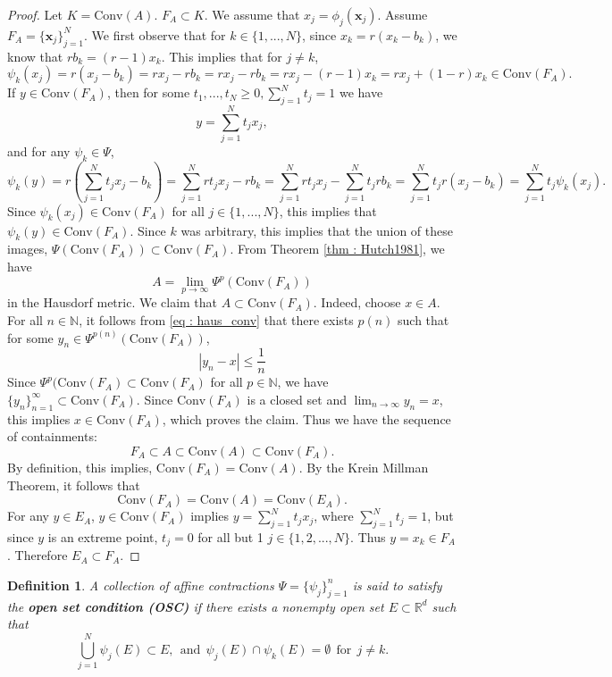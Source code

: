 \documentclass [52pt] {article}
\newcommand{\R}{\mathbb{R}}
\newcommand{\N}{\mathbb{N}}
\newcommand{\conv}{\text{Conv}}
\newtheorem{definition}{Definition}
\begin{document}
\begin{proof}
Let $K = \conv(A)$.  $F_A\subset K$.  We assume that $x_j = \phi_j(\mathbf{x}_j)$.  Assume $F_A = \{\mathbf{x}_j\}_{j=1}^N$.  We first observe that for $k\in \{1,...,N\}$, since $x_k = r(x_k-b_k)$, we know that $rb_k = (r-1)x_k.$  This implies that for $j\not=k$, 
\[\psi_k(x_j) = r(x_j-b_k) = rx_j-rb_k =rx_j-rb_k = rx_j-(r-1)x_k = rx_j+(1-r)x_k\in\conv(F_A).\] 
If $y\in\conv(F_A)$, then for some $t_1,...,t_N\ge 0, \sum_{j=1}^N t_j = 1$ we have
\[y = \sum_{j=1}^Nt_j x_j,\]
and for any $\psi_k\in\Psi$,
\[\psi_k(y) = r\left(\sum_{j=1}^N t_jx_j - b_k\right) = \sum_{j=1}^N rt_jx_j -rb_k = \sum_{j=1}^N rt_jx_j-\sum_{j=1}^Nt_j rb_k = \sum_{j=1}^N t_j r(x_j-b_k) = \sum_{j=1}^N t_j\psi_k(x_j).\]
Since $\psi_k(x_j)\in \conv(F_A)$ for all $j\in \{1,...,N\}$, this implies that $\psi_k(y) \in \conv(F_A)$.  Since $k$ was arbitrary, this implies that the union of these images, $\Psi(\conv(F_A))\subset\conv(F_A)$.  From Theorem \ref{thm : Hutch1981}, we have 
\begin{equation}\label{eq : haus_conv}
A = \lim_{p\to\infty}\Psi^p(\conv(F_A))
\end{equation}
 in the Hausdorf metric.  We claim that $A\subset\conv(F_A)$.  Indeed, choose $x\in A$.  For all $n\in \N$, it follows from \ref{eq : haus_conv} that there exists $p(n)$ such that for some $y_n\in \Psi^{p(n)}(\conv(F_A))$,
 \[|y_n-x|\le \frac{1}{n}\]
Since $\Psi^p(\conv(F_A)\subset \conv(F_A)$ for all $p\in \N$, we have $\{y_n\}_{n=1}^\infty\subset\conv(F_A)$.  Since $\conv(F_A)$ is a closed set and $\lim_{n\to\infty}y_n = x$, this implies $x\in\conv(F_A)$, which proves the claim.   Thus we have the sequence of containments:
\[F_A\subset A\subset\conv(A)\subset\conv(F_A).\]
By definition, this implies, $\conv(F_A) = \conv(A)$.  By the Krein Millman Theorem, it follows that
\[\conv(F_A) = \conv(A) = \conv(E_A).\]
For any $y\in E_A$, $y\in\conv(F_A)$ implies $y =\sum_{j=1}^N t_jx_j$, where $\sum_{j=1}^N t_j = 1$, but since $y$ is an extreme point, $t_j = 0$ for all but 1 $j\in\{1,2,...,N\}$.  Thus $y = x_k\in F_A$.  Therefore $E_A\subset F_A$.
\end{proof}

\begin{definition} A collection of affine contractions $\Psi = \{\psi_j\}_{j=1}^n$ is said to satisfy the {\bf{open set condition (OSC)}} if there exists a nonempty open set $E\subset\R^d$ such that 
\[\bigcup_{j=1}^N \psi_j(E)\subset E,\:\:\text{and}\:\:\psi_j(E)\cap\psi_k(E) = \emptyset\:\:\text{for}\:\:j\not=k.\]
\end{definition}
\end{document}
